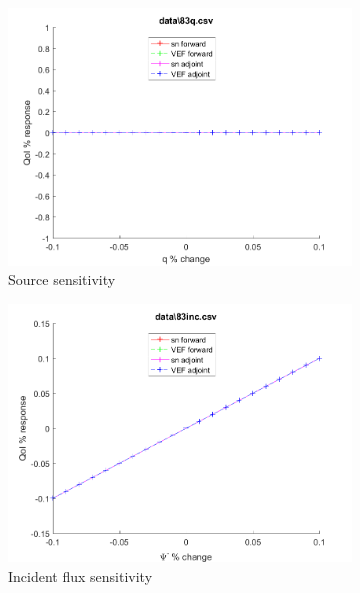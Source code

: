 \documentclass{article}
\begin{document}
\begin{figure}[H]
\label{Case83Sens}
\centering
\begin{subfigure}{.5\textwidth}
  \centering
  \includegraphics[width=.98\linewidth]{IanProposal/figures2/83qSens.png}
  \caption{Source sensitivity}
  \label{fig:sfig1}
\end{subfigure}%
\begin{subfigure}{.5\textwidth}
  \centering
  \includegraphics[width=.98\linewidth]{IanProposal/figures2/83incSens.png}
  \caption{Incident flux sensitivity}
  \label{fig:sfig4}
\end{subfigure}%
\\
\begin{subfigure}{.5\textwidth}
  \centering

\end{subfigure}
\end{figure}
\end{document}
